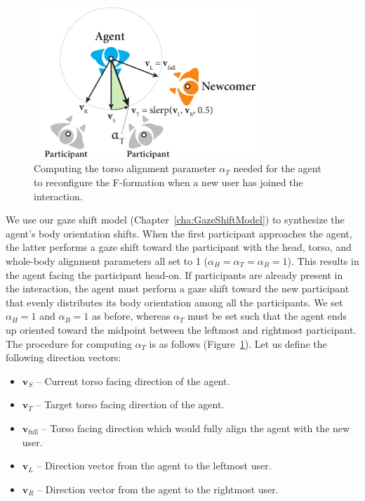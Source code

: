 \begin{figure}
\centering
\includegraphics[width=0.75\textwidth]{conversationalrolegaze/Figures/FTorsoAlign.pdf}
\caption{Computing the torso alignment parameter $\alpha_T$ needed for the agent to reconfigure the F-formation when a new user has joined the interaction.}
\label{fig:FTorsoAlign}
\end{figure}

We use our gaze shift model (Chapter~\ref{cha:GazeShiftModel}) to synthesize the agent's body orientation shifts. When the first participant approaches the agent, the latter performs a gaze shift toward the participant with the head, torso, and whole-body alignment parameters all set to 1 ($\alpha_H = \alpha_T = \alpha_B = 1$). This results in the agent facing the participant head-on. If participants are already present in the interaction, the agent must perform a gaze shift toward the new participant that evenly distributes its body orientation among all the participants. We set $\alpha_H = 1$ and $\alpha_B = 1$ as before, whereas $\alpha_T$ must be set such that the agent ends up oriented toward the midpoint between the leftmost and rightmost participant. The procedure for computing $\alpha_T$ is as follows (Figure~\ref{fig:FTorsoAlign}). Let us define the following direction vectors:

\begin{itemize}
\item $\mathbf{v}_S$ -- Current torso facing direction of the agent.
\item $\mathbf{v}_T$ -- Target torso facing direction of the agent.
\item $\mathbf{v}_\mathrm{full}$ -- Torso facing direction which would fully align the agent with the new user.
\item $\mathbf{v}_L$ -- Direction vector from the agent to the leftmost user.
\item $\mathbf{v}_R$ -- Direction vector from the agent to the rightmost user.
\end{itemize}

